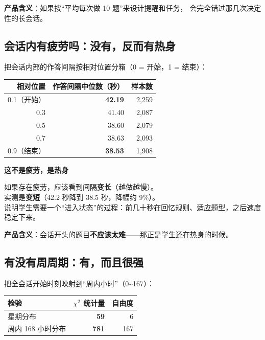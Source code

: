 \documentclass[UTF8,a4paper,11pt]{ctexart}
\newenvironment{explainbox}[1]
{\begin{center}\begin{minipage}{0.94\textwidth}\colorbox{boxbg}{\parbox{0.92\textwidth}{\textbf{#1}\par\vspace{2pt}}}}
{\end{minipage}\end{center}}
\begin{document}
\textbf{产品含义}：如果按“平均每次做 10 题”来设计提醒和任务，
会完全错过那几次决定性的长会话。

\subsection{会话内有疲劳吗：没有，反而有热身}

把会话内部的作答间隔按相对位置分箱（0 = 开始，1 = 结束）：

\begin{center}
\begin{tabular}{rrr}
\toprule
\textbf{相对位置} & \textbf{作答间隔中位数（秒）} & \textbf{样本数} \\
\midrule
0.1（开始） & \textbf{42.19} & 2,259 \\
0.3 & 41.40 & 2,087 \\
0.5 & 38.60 & 2,079 \\
0.7 & 38.63 & 2,093 \\
0.9（结束） & \textbf{38.53} & 1,908 \\
\bottomrule
\end{tabular}
\end{center}

\begin{explainbox}{这不是疲劳，是热身}
如果存在疲劳，应该看到间隔\textbf{变长}（越做越慢）。\\
实测是\textbf{变短}（42.2 秒降到 38.5 秒，降幅约 9\%）。\\
说明学生需要一个“进入状态”的过程：前几十秒在回忆规则、适应题型，之后速度稳定下来。
\end{explainbox}

\textbf{产品含义}：会话开头的题目\textbf{不应该太难}——那正是学生还在热身的时候。

\subsection{有没有周周期：有，而且很强}

把全会话开始时刻映射到“周内小时”（0\textasciitilde 167）：

\begin{center}
\begin{tabular}{lrr}
\toprule
\textbf{检验} & $\chi^2$ 统计量 & \textbf{自由度} \\
\midrule
星期分布 & \textbf{59} & 6 \\
周内 168 小时分布 & \textbf{781} & 167 \\
\bottomrule
\end{tabular}
\end{center}
\end{document}
